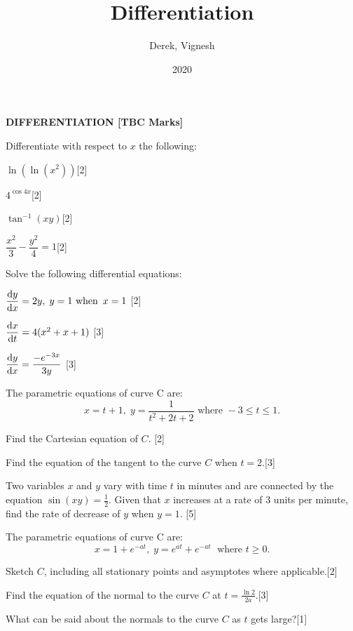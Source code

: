 \documentclass[12pt, a4 paper]{article}
\title{Differentiation}
\author{Derek, Vignesh}
\date{2020}
\begin{document}
\maketitle

\textbf{DIFFERENTIATION [TBC Marks]}
\begin{outline}[enumerate]

\1 Differentiate with respect to $x$ the following: %

	\2 $\ln (\ln ({x^2}))$\hfill[2]

	\2 $4^{\cos 4x}$\hfill[2]

	\2 $\tan ^{ - 1}(xy)$\hfill[2]

	\2 $\dfrac{{{x^2}}}{3} - \dfrac{{{y^2}}}{4} = 1$\hfill[2]

\1 Solve the following differential equations: %

	\2 $\dfrac{{{\rm{d}}y}}{{{\rm{d}}x}} = 2y,\;y = 1{\textrm{ when }}\,x = 1$ \hfill[2]

	\2 $\dfrac{{{\rm{d}}x}}{{{\rm{d}}t}} = 4({x^2} + x + 1)$ \hfill[3]

	\2 $\dfrac{{{\rm{d}}y}}{{{\rm{d}}x}} = \dfrac{{ - {e^{ - 3x}}}}{{3y}}$ \hfill[3]

\1 The parametric equations of curve C are: \[x = t + 1,\;y = \frac{1}{{{t^2} + 2t + 2}}{\textrm{ where }} - 3 \leq t \leq 1.\] %

	\2 Find the Cartesian equation of $C$. \hfill[2]

	\2 Find the equation of the tangent to the curve $C$ when $t=2$.\hfill[3]

\1 Two variables $x$ and $y$ vary with time $t$ in minutes and are connected by the equation $\sin (xy) = \frac{1}{2}$. Given that $x$ increases at a rate of 3 units per minute, find the rate of decrease of $y$ when $y = 1$. \hfill[5] %

\1 The parametric equations of curve C are: \[x = 1 + {e^{ - at}},\;y = {e^{at}} + {e^{ - at}}\;{\textrm{ where }}t \geq 0.\] %

	\2  Sketch $C$, including all stationary points and asymptotes where applicable.\hfill[2]

	\2 Find the equation of the normal to the curve $C$ at $t = \frac{\ln{2}}{{2a}}$.\hfill[3]

	\2 What can be said about the normals to the curve $C$ as $t$ gets large?\hfill[1]


\end{outline}
\end{document}
